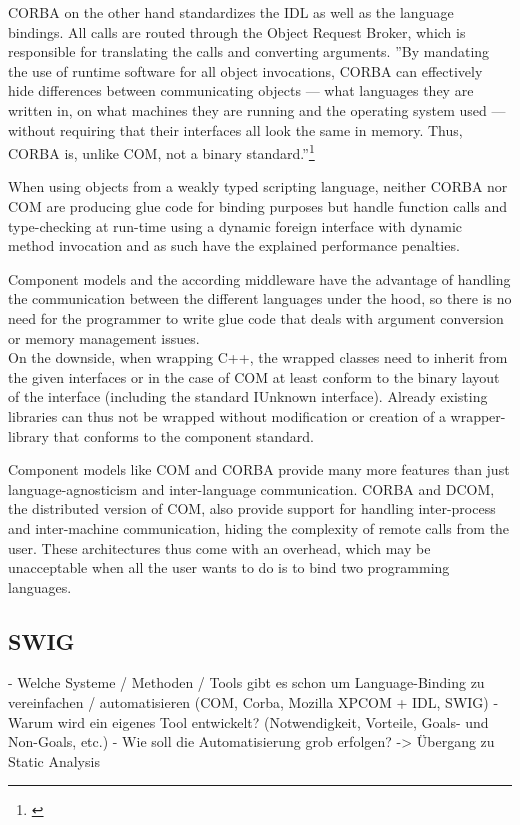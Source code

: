 CORBA on the other hand standardizes the IDL as well as the language bindings. All calls are routed through the Object Request Broker, which is responsible for translating the calls and converting arguments. ''By mandating the use of runtime software for all object invocations, CORBA can effectively hide differences between communicating objects — what languages they are written in, on what machines they are running and the operating system used — without requiring that their interfaces all look the same in memory. Thus, CORBA is, unlike COM, not a binary standard.''\footnote{\citep[83]{ComponentTechnology}}

When using objects from a weakly typed scripting language, neither CORBA nor COM are producing glue code for binding purposes but handle function calls and type-checking at run-time using a dynamic foreign interface with dynamic method invocation and as such have the explained performance penalties.

Component models and the according middleware have the advantage of handling the communication between the different languages under the hood, so there is no need for the programmer to write glue code that deals with argument conversion or memory management issues.\\
On the downside, when wrapping C++, the wrapped classes need to inherit from the given interfaces or in the case of COM at least conform to the binary layout of the interface (including the standard IUnknown interface). Already existing libraries can thus not be wrapped without modification or creation of a wrapper-library that conforms to the component standard.


Component models like COM and CORBA provide many more features than just language-agnosticism and inter-language communication. CORBA and DCOM, the distributed version of COM, also provide support for handling inter-process and inter-machine communication, hiding the complexity of remote calls from the user. These architectures thus come with an overhead, which may be unacceptable when all the user wants to do is to bind two programming languages.


\subsection{SWIG}

  - Welche Systeme / Methoden / Tools gibt es schon um Language-Binding zu vereinfachen / automatisieren (COM, Corba, Mozilla XPCOM + IDL, SWIG)
  - Warum wird ein eigenes Tool entwickelt? (Notwendigkeit, Vorteile, Goals- und Non-Goals, etc.)
  - Wie soll die Automatisierung grob erfolgen? -> Übergang zu Static Analysis